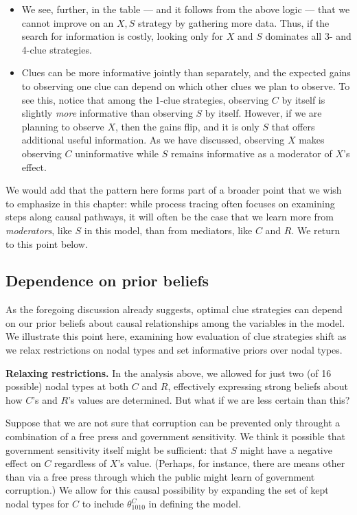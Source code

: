 \documentclass[12pt,]{book}
\begin{document}
\begin{itemize}
\item
  We see, further, in the table --- and it follows from the above logic --- that we cannot improve on an \(X, S\) strategy by gathering more data. Thus, if the search for information is costly, looking only for \(X\) and \(S\) dominates all 3- and 4-clue strategies.
\item
  Clues can be more informative jointly than separately, and the expected gains to observing one clue can depend on which other clues we plan to observe. To see this, notice that among the 1-clue strategies, observing \(C\) by itself is slightly \emph{more} informative than observing \(S\) by itself. However, if we are planning to observe \(X\), then the gains flip, and it is only \(S\) that offers additional useful information. As we have discussed, observing \(X\) makes observing \(C\) uninformative while \(S\) remains informative as a moderator of \(X\)'s effect.
\end{itemize}

We would add that the pattern here forms part of a broader point that we wish to emphasize in this chapter: while process tracing often focuses on examining steps along causal pathways, it will often be the case that we learn more from \emph{moderators}, like \(S\) in this model, than from mediators, like \(C\) and \(R\). We return to this point below.

\hypertarget{dependence-on-prior-beliefs}{%
\subsection{Dependence on prior beliefs}\label{dependence-on-prior-beliefs}}

As the foregoing discussion already suggests, optimal clue strategies can depend on our prior beliefs about causal relationships among the variables in the model. We illustrate this point here, examining how evaluation of clue strategies shift as we relax restrictions on nodal types and set informative priors over nodal types.

\textbf{Relaxing restrictions.} In the analysis above, we allowed for just two (of 16 possible) nodal types at both \(C\) and \(R\), effectively expressing strong beliefs about how \(C\)'s and \(R\)'s values are determined. But what if we are less certain than this?

Suppose that we are not sure that corruption can be prevented only throught a combination of a free press and government sensitivity. We think it possible that government sensitivity itself might be sufficient: that \(S\) might have a negative effect on \(C\) regardless of \(X\)'s value. (Perhaps, for instance, there are means other than via a free press through which the public might learn of government corruption.) We allow for this causal possibility by expanding the set of kept nodal types for \(C\) to include \(\theta^C_{1010}\) in defining the model.
\end{document}
